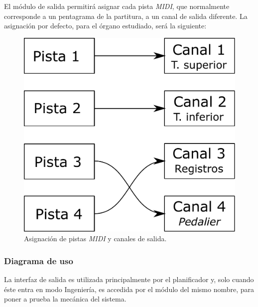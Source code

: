 El módulo de salida permitirá asignar cada pista \textit{MIDI}, que normalmente corresponde a un pentagrama de la partitura, a un canal de salida diferente. La asignación por defecto, para el órgano estudiado, será la siguiente:

\smallskip

\begin{figure}[H]
	\noindent \begin{centering}
		\includegraphics[width=\linewidth/3]{capitulo4/map}
		\par\end{centering}
	\smallskip
	\caption{\label{fig:map} Asignación de pistas \textit{MIDI} y canales de salida.}
\end{figure} 

\smallskip

\subsubsection{Diagrama de uso}

La interfaz de salida es utilizada principalmente por el planificador y, solo cuando éste entra en modo Ingeniería, es accedida por el módulo del mismo nombre, para poner a prueba la mecánica del sistema.

\smallskip

